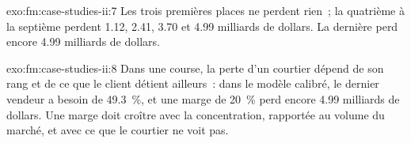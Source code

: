 \begin{solution}{exo:fm:case-studies-ii:7}
Les trois premières places ne perdent rien~; la quatrième à la septième perdent 1.12, 2.41, 3.70 et 4.99 milliards de dollars. La dernière perd encore 4.99 milliards de dollars.
\end{solution}

\begin{solution}{exo:fm:case-studies-ii:8}
Dans une course, la perte d'un courtier dépend de son rang et de ce que le client détient ailleurs~: dans le modèle calibré, le dernier vendeur a besoin de 49.3~\%, et une
marge de 20~\% perd encore 4.99 milliards de dollars. Une marge doit croître avec la concentration, rapportée au volume du marché, et avec ce que le courtier ne voit pas.
\end{solution}

